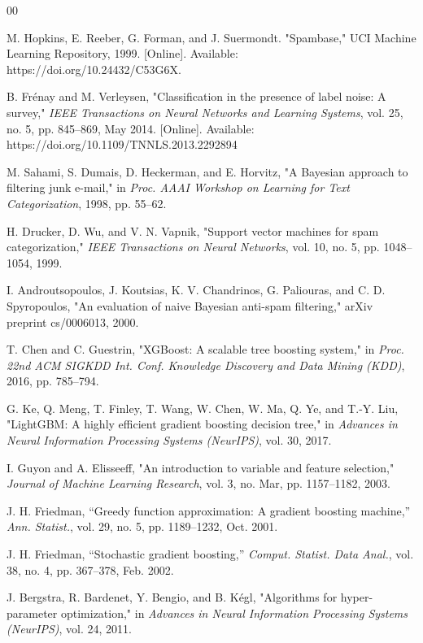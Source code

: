 \documentclass[conference]{IEEEtran}
\begin{document}
\begin{thebibliography}{00}

M. Hopkins, E. Reeber, G. Forman, and J. Suermondt. "Spambase," UCI Machine Learning Repository, 1999. [Online]. Available: https://doi.org/10.24432/C53G6X.

B. Fr\'{e}nay and M. Verleysen, 
"Classification in the presence of label noise: A survey," 
\textit{IEEE Transactions on Neural Networks and Learning Systems}, 
vol. 25, no. 5, pp. 845--869, May 2014. 
[Online]. Available: https://doi.org/10.1109/TNNLS.2013.2292894

M. Sahami, S. Dumais, D. Heckerman, and E. Horvitz, 
"A Bayesian approach to filtering junk e-mail," 
in \textit{Proc. AAAI Workshop on Learning for Text Categorization}, 
1998, pp. 55--62. 

H. Drucker, D. Wu, and V. N. Vapnik, 
"Support vector machines for spam categorization," 
\textit{IEEE Transactions on Neural Networks}, 
vol. 10, no. 5, pp. 1048--1054, 1999. 

I. Androutsopoulos, J. Koutsias, K. V. Chandrinos, G. Paliouras, and C. D. Spyropoulos, 
"An evaluation of naive Bayesian anti-spam filtering," 
arXiv preprint cs/0006013, 2000.

T. Chen and C. Guestrin, 
"XGBoost: A scalable tree boosting system," 
in \textit{Proc. 22nd ACM SIGKDD Int. Conf. Knowledge Discovery and Data Mining (KDD)}, 
2016, pp. 785--794.

G. Ke, Q. Meng, T. Finley, T. Wang, W. Chen, W. Ma, Q. Ye, and T.-Y. Liu, 
"LightGBM: A highly efficient gradient boosting decision tree," 
in \textit{Advances in Neural Information Processing Systems (NeurIPS)}, 
vol. 30, 2017. 

I. Guyon and A. Elisseeff, 
"An introduction to variable and feature selection," 
\textit{Journal of Machine Learning Research}, 
vol. 3, no. Mar, pp. 1157--1182, 2003. 


J. H. Friedman,
``Greedy function approximation: A gradient boosting machine,''
\textit{Ann. Statist.}, vol. 29, no. 5, pp. 1189--1232,
Oct. 2001.

J. H. Friedman,
``Stochastic gradient boosting,''
\textit{Comput. Statist. Data Anal.}, vol. 38, no. 4,
pp. 367--378, Feb. 2002.

J. Bergstra, R. Bardenet, Y. Bengio, and B. K\'{e}gl, 
"Algorithms for hyper-parameter optimization," 
in \textit{Advances in Neural Information Processing Systems (NeurIPS)}, 
vol. 24, 2011.


\end{thebibliography}
\end{document}
